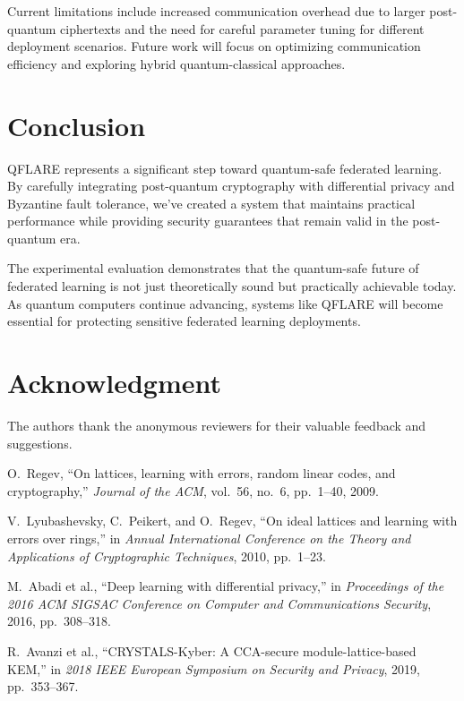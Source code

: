 \documentclass[journal,onecolumn]{IEEEtran}
\begin{document}
Current limitations include increased communication overhead due to larger post-quantum ciphertexts and the need for careful parameter tuning for different deployment scenarios. Future work will focus on optimizing communication efficiency and exploring hybrid quantum-classical approaches.

\section{Conclusion}

QFLARE represents a significant step toward quantum-safe federated learning. By carefully integrating post-quantum cryptography with differential privacy and Byzantine fault tolerance, we've created a system that maintains practical performance while providing security guarantees that remain valid in the post-quantum era.

The experimental evaluation demonstrates that the quantum-safe future of federated learning is not just theoretically sound but practically achievable today. As quantum computers continue advancing, systems like QFLARE will become essential for protecting sensitive federated learning deployments.

\section*{Acknowledgment}

The authors thank the anonymous reviewers for their valuable feedback and suggestions.

\begin{thebibliography}{100}

O.~Regev, ``On lattices, learning with errors, random linear codes, and cryptography,'' \emph{Journal of the ACM}, vol.~56, no.~6, pp.~1--40, 2009.

V.~Lyubashevsky, C.~Peikert, and O.~Regev, ``On ideal lattices and learning with errors over rings,'' in \emph{Annual International Conference on the Theory and Applications of Cryptographic Techniques}, 2010, pp.~1--23.

M.~Abadi et al., ``Deep learning with differential privacy,'' in \emph{Proceedings of the 2016 ACM SIGSAC Conference on Computer and Communications Security}, 2016, pp.~308--318.

R.~Avanzi et al., ``CRYSTALS-Kyber: A CCA-secure module-lattice-based KEM,'' in \emph{2018 IEEE European Symposium on Security and Privacy}, 2019, pp.~353--367.

\end{thebibliography}
\end{document}
